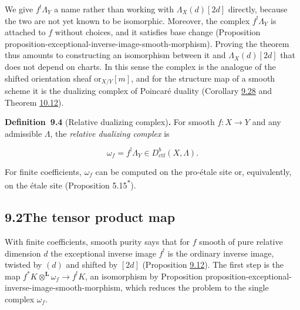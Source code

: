\documentclass[11pt]{article}
\newenvironment{bpstatement}[2]{\par\addvspace{0.6\baselineskip}\noindent\textbf{#1}#2\textbf{.}\enspace\ignorespaces}
  {\par\addvspace{0.4\baselineskip}}
\newcommand{\bpout}[1]{#1\textsuperscript{\hyperlink{bp-outside}{\ensuremath{\ast}}}}
\begin{document}
We give \(f^!\Lambda_Y\) a name rather than working with \(\Lambda_X(d)[2d]\) directly, because the two are not yet known to be isomorphic. Moreover, the complex \(f^!\Lambda_Y\) is attached to \(f\) without choices, and it satisfies base change (Proposition proposition-exceptional-inverse-image-smooth-morphism). Proving the theorem thus amounts to constructing an isomorphism between it and \(\Lambda_X(d)[2d]\) that does not depend on charts. In this sense the complex is the analogue of the shifted orientation sheaf \(\mathrm{or}_{X/Y}[m]\), and for the structure map of a smooth scheme it is the dualizing complex of Poincaré duality (Corollary \hyperref[bp98]{9.28} and Theorem \hyperref[bp137]{10.12}).

\label{bp13}%
\begin{bpstatement}{Definition~9.4}{ (Relative dualizing complex)}
For smooth \(f:X\to Y\) and any admissible \(\Lambda\), the \emph{relative dualizing complex} is

\[
\omega_f=f^{!}\Lambda_Y
\in D^b_{\mathrm{ctf}}(X,\Lambda).
\tag{9.3}
\]
\end{bpstatement}

\label{bp14}%
For finite coefficients, \(\omega_f\) can be computed on the pro-étale site or, equivalently, on the étale site (Proposition \bpout{5.15}).


\subsection*{\texorpdfstring{9.2\quad The tensor product map}{9.2 The tensor product map}}
\label{bp15}%
\label{bp16}%
With finite coefficients, smooth purity says that for \(f\) smooth of pure relative dimension \(d\) the exceptional inverse image \(f^!\) is the ordinary inverse image, twisted by \((d)\) and shifted by \([2d]\) (Proposition \hyperref[bp39]{9.12}). The first step is the map \(f^*K\otimes^{\mathbf L}\omega_f\to f^!K\), an isomorphism by Proposition proposition-exceptional-inverse-image-smooth-morphism, which reduces the problem to the single complex \(\omega_f\).
\end{document}
